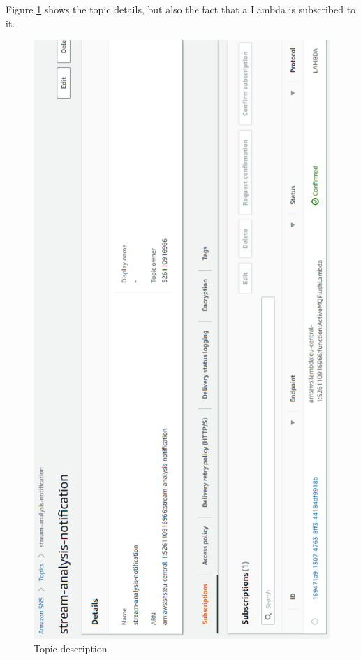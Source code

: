 Figure \ref{fig:sns} shows the topic details, but also the fact that a Lambda is subscribed to it.

\begin{figure}[p]
	\centering
	\noindent
	\includegraphics[width=0.5\paperwidth]{./images/aws_resources/SNS.PNG}
	\caption{Topic description}
	\label{fig:sns}
\end{figure}

